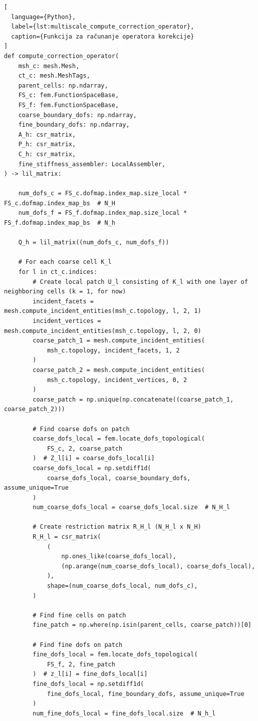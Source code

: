 \documentclass[zavrsnirad]{fer}
\begin{document}
\begin{lstlisting}[
  language={Python},
  label={lst:multiscale_compute_correction_operator},
  caption={Funkcija za računanje operatora korekcije}
]
def compute_correction_operator(
    msh_c: mesh.Mesh,
    ct_c: mesh.MeshTags,
    parent_cells: np.ndarray,
    FS_c: fem.FunctionSpaceBase,
    FS_f: fem.FunctionSpaceBase,
    coarse_boundary_dofs: np.ndarray,
    fine_boundary_dofs: np.ndarray,
    A_h: csr_matrix,
    P_h: csr_matrix,
    C_h: csr_matrix,
    fine_stiffness_assembler: LocalAssembler,
) -> lil_matrix:

    num_dofs_c = FS_c.dofmap.index_map.size_local * FS_c.dofmap.index_map_bs  # N_H
    num_dofs_f = FS_f.dofmap.index_map.size_local * FS_f.dofmap.index_map_bs  # N_h

    Q_h = lil_matrix((num_dofs_c, num_dofs_f))

    # For each coarse cell K_l
    for l in ct_c.indices:
        # Create local patch U_l consisting of K_l with one layer of neighboring cells (k = 1, for now)
        incident_facets = mesh.compute_incident_entities(msh_c.topology, l, 2, 1)
        incident_vertices = mesh.compute_incident_entities(msh_c.topology, l, 2, 0)
        coarse_patch_1 = mesh.compute_incident_entities(
            msh_c.topology, incident_facets, 1, 2
        )
        coarse_patch_2 = mesh.compute_incident_entities(
            msh_c.topology, incident_vertices, 0, 2
        )
        coarse_patch = np.unique(np.concatenate((coarse_patch_1, coarse_patch_2)))

        # Find coarse dofs on patch
        coarse_dofs_local = fem.locate_dofs_topological(
            FS_c, 2, coarse_patch
        )  # Z_l[i] = coarse_dofs_local[i]
        coarse_dofs_local = np.setdiff1d(
            coarse_dofs_local, coarse_boundary_dofs, assume_unique=True
        )
        num_coarse_dofs_local = coarse_dofs_local.size  # N_H_l

        # Create restriction matrix R_H_l (N_H_l x N_H)
        R_H_l = csr_matrix(
            (
                np.ones_like(coarse_dofs_local),
                (np.arange(num_coarse_dofs_local), coarse_dofs_local),
            ),
            shape=(num_coarse_dofs_local, num_dofs_c),
        )

        # Find fine cells on patch
        fine_patch = np.where(np.isin(parent_cells, coarse_patch))[0]

        # Find fine dofs on patch
        fine_dofs_local = fem.locate_dofs_topological(
            FS_f, 2, fine_patch
        )  # z_l[i] = fine_dofs_local[i]
        fine_dofs_local = np.setdiff1d(
            fine_dofs_local, fine_boundary_dofs, assume_unique=True
        )
        num_fine_dofs_local = fine_dofs_local.size  # N_h_l


\end{lstlisting}
\end{document}
